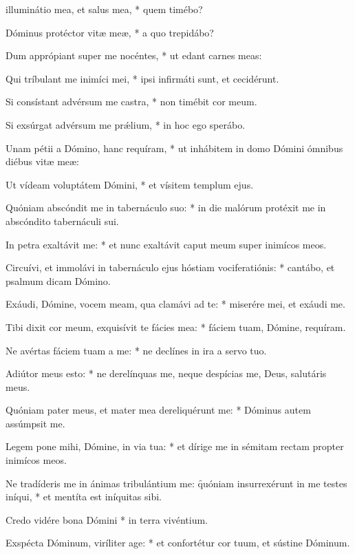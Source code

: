 \begin{psalmus}

 illuminátio mea, et salus mea, * quem timébo?

Dóminus protéctor vitæ meæ, * a quo trepidábo?

Dum apprópiant super me nocéntes, * ut edant carnes meas:

Qui tríbulant me inimíci mei, * ipsi infirmáti sunt, et cecidérunt.

Si consístant advérsum me castra, * non timébit cor meum.

Si exsúrgat advérsum me prǽlium, * in hoc ego sperábo.

Unam pétii a Dómino, hanc requíram, * ut inhábitem in domo Dómini ómnibus diébus vitæ meæ:

Ut vídeam voluptátem Dómini, * et vísitem templum ejus.

Quóniam abscóndit me in tabernáculo suo: * in die malórum protéxit me in abscóndito tabernáculi sui.

In petra exaltávit me: * et nunc exaltávit caput meum super inimícos meos.

Circuívi, et immolávi in tabernáculo ejus hóstiam vociferatiónis: * cantábo, et psalmum dicam Dómino.

Exáudi, Dómine, vocem meam, qua clamávi ad te: * miserére mei, et exáudi me.

Tibi dixit cor meum, exquisívit te fácies mea: * fáciem tuam, Dómine, requíram.

Ne avértas fáciem tuam a me: * ne declínes in ira a servo tuo.

Adiútor meus esto: * ne derelínquas me, neque despícias me, Deus, salutáris meus.

Quóniam pater meus, et mater mea dereliquérunt me: * Dóminus autem assúmpsit me.

Legem pone mihi, Dómine, in via tua: * et dírige me in sémitam rectam propter inimícos meos.

Ne tradíderis me in ánimas tribulántium me: \f quóniam insurrexérunt in me testes iníqui, * et mentíta est iníquitas sibi.

Credo vidére bona Dómini * in terra vivéntium.

Exspécta Dóminum, viríliter age: * et confortétur cor tuum, et sústine Dóminum.

\end{psalmus}
